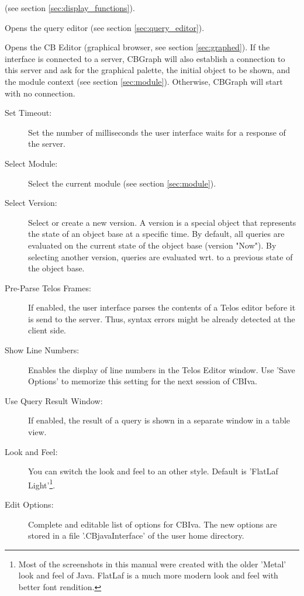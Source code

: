 \begin{description}
\begin{description}
             (see section \ref{sec:display_functions}).
	\item[Query Editor:] Opens the query editor (see section \ref{sec:query_editor}).
	\item[Graph Editor:] Opens the CB Editor (graphical browser, see section \ref{sec:graphed}). If the
	interface is connected to a server, CBGraph will also establish a connection to this
	server and ask for the graphical palette, the initial object to be shown, and the module context (see section \ref{sec:module}). Otherwise, CBGraph will start with no connection.
	\end{description}
\item[Options:]
	\begin{description}
	\item[Set Timeout:] Set the number of milliseconds the user interface waits for a response of
	the server.
	\item[Select Module:] Select the current module (see section \ref{sec:module}).
	\item[Select Version:] Select or create a new version. A version is a special object
	that represents the state of an object base at a specific time. By default, all queries
	are evaluated on the current state of the object base (version "Now"). By selecting another
	version, queries are evaluated wrt. to a previous state of the object base.
	\item[Pre-Parse Telos Frames:] If enabled, the user interface parses the contents of
	a Telos editor before it is send to the server. Thus, syntax errors might be already
	detected at the client side.
	\item[Show Line Numbers:] Enables the display of line numbers in the Telos Editor window.
        Use 'Save Options' to memorize this setting for the next session of CBIva.
	\item[Use Query Result Window:] If enabled, the result of a query is shown in a separate window
	in a table view.
	\item[Look and Feel:] You can switch the look and feel to an other style.
        Default is 'FlatLaf Light'\footnote{Most of the screenshots in this manual were created with the
        older 'Metal' look and feel of Java. FlatLaf is a much more modern look and feel with better
        font rendition.}.
	\item[Edit Options:] Complete and editable list of options for CBIva. The new options
        are stored in a file '.CBjavaInterface' of the user home directory.
	\end{description}

\end{description}
